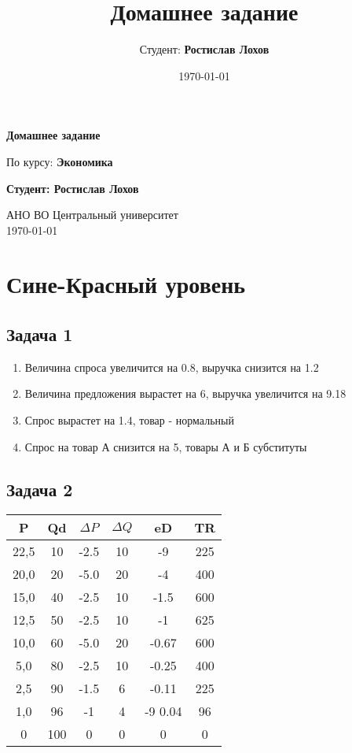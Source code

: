 \documentclass[a4paper,12pt]{article}
\title{Домашнее задание}
\author{Студент: \textbf{Ростислав Лохов}}
\date{\today}
\begin{document}
\begin{titlepage}
    \centering
    \vspace*{1cm}

    \Huge
    \textbf{Домашнее задание}

    \vspace{0.5cm}
    \LARGE
    По курсу: \textbf{Экономика}

    \vspace{1.5cm}

    \textbf{Студент: Ростислав Лохов}

    \vfill

    \Large
    АНО ВО Центральный университет\\
    \vspace{0.3cm}
    \today

\end{titlepage}

\tableofcontents
\newpage

\section{Сине-Красный уровень}


\subsection{Задача 1}
\begin{enumerate}
    \item Величина спроса увеличится на 0.8, выручка снизится на 1.2
    \item Величина предложения вырастет на 6, выручка увеличится на 9.18
    \item Спрос вырастет на 1.4, товар - нормальный
    \item Спрос на товар А снизится на 5, товары А и Б субституты
\end{enumerate}


\subsection{Задача 2}
\begin{center}
    \begin{tabular}{c c c c c c}
    P & Qd & $\Delta P$ & $\Delta Q$ & eD & TR \\ 
    \hline
    22,5 & 10  & -2.5 & 10 & -9 & 225 \\
    20,0 & 20  & -5.0 & 20 & -4 & 400 \\
    15,0 & 40  & -2.5 & 10 & -1.5 & 600 \\
    12,5 & 50  & -2.5 & 10 & -1 & 625 \\
    10,0 & 60  & -5.0 & 20 & -0.67 & 600 \\
    5,0  & 80  & -2.5 & 10 & -0.25 & 400 \\
    2,5  & 90  & -1.5 & 6 & -0.11 & 225 \\
    1,0  & 96  & -1   & 4 & -9 0.04  &96 \\
    0    & 100 &  0   & 0 & 0 & 0
    \end{tabular}
\end{center}
\end{document}
